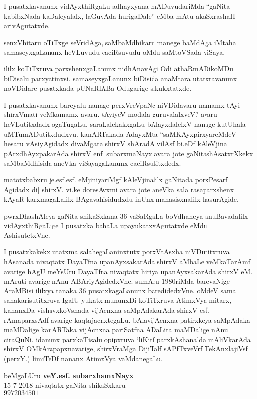{ I pusatxkavanunx vidAyxthiRgaLu adhayxyana mADuvudariMda ``gaNita kabibxNada kaDaleyalalx, laGuvAda hurigaDale'' eMba mAtu akaSxrashaH arivAgutatxde.

 senxVhitaru oTiTxge seVridAga, saMbaMdhikaru manege baMdAga iMtaha samaseyxgaLanunx heVLuvudu caciRsuvudu oMdu saMtoVSada viSaya.

\eject

  ililx koTiTxruva parxshenxgaLanunx nidhAnavAgi Odi athaRmADikoMDu biDisalu parxyatinxsi. samaseyxgaLanunx biDisida anaMtara utatxravanunx noVDidare pusatxkada pUNaRlABa Odugarige sikukxtatxde.

 I pusatxkavanunx bareyalu nanage perxVreVpaNe niVDidavaru namamx tAyi shirxVmati veMkamamx avaru. tAyiyeV modala guruvalalxveV? avaru heVLutitxdadx ogaTugaLu, saraLalekakxgaLu bAlayxdalelxV nanage kutUhala uMTumADutitxdudxvu. kanARTakada AdayxMta ``saMKAyxpirxyareMdeV hesaru vAsiyAgidadx divaMgata shirxV shAradA vilAsf bi.eDf kAleVjina pArxdhAyxpakarAda shirxV enf. subarxmaNayx avara jote gaNitashAsatxrXkekx saMbaMdhisida aneVka viSayagaLanunx caciRsutitxdedx.

 matotxbabxru je.esf.esf. eMjiniyariMgf kAleVjinalilx gaNitada porxPesarf Agidadx di| shirxV. vi.ke doresAvxmi avara jote aneVka sala rasaparxshenx kAyaR karxmagaLalilx BAgavahisidudxdu inUnx manasisxnalilx hasurAgide.

 pwrxDhashAleya gaNita shikaSxkana $36$ vaSaRgaLa boVdhaneya anuBavadalilx vidAyxthiRgaLige I pusatxka bahaLa upayukatxvAgutatxde eMdu AshisutetxVne.

 I pusatxkakekx utatxma salahegaLaninxtutx porxVtAsxha niVDutitxruva hAsanada nivaqtatx DayaTfna upanAyxsakarAda shirxV aMbaLe veMkaTarAmf avarige hAgU meYsUru DayaTfna nivaqtatx hiriya upanAyxsakarAda shirxV eM. mAruti avarige nAnu ABAriyAgidedxVne. sumAru $1980$riMda barevaNige AraMBisi ililxya tanaka $36$ pusatxkagaLanunx baredidedxVne. oMdeV sama sahakarisutitxruva IgalU yukatx mununxDi koTiTxruva AtimxVya mitarx, kananxDa vishavxkoVshada vijAcnxna saMpAdakarAda shirxV esf. rAmaparxsAdf avarige kaqtajacnxtegaLu. bAlavijAcnxna patirxkeya saMpAdaka maMDalige kanARTaka vijAcnxna pariSatfna ADaLita maMDalige nAnu ciraQuNi. idanunx parxkaTisalu opipxruva `liKitf parxkAshana'da mAliVkarAda shirxV OMkArapapxnavarige, shirxVraMga DijiTalf sAPfTxveVrf TekAnxlajiVsf (perxY.) limiTeDf nananx AtimxVya vaMdanegaLu.

\begin{flushright}
 beMgaLUru \hfill{\bf veY.esf. subarxhamxNayx}\hfill\\
 {\rm 15-7-2018} \hfill{nivaqtatx gaNita shikaSxkaru}\\
 \hfill$9972034501$  
\end{flushright}
}
